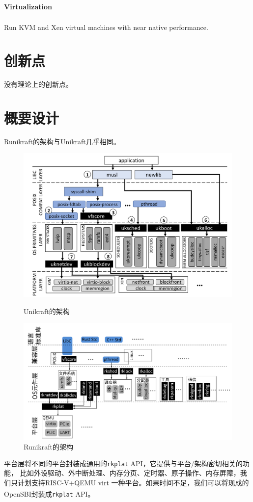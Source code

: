 \documentclass[UTF8,fontset=none,linespread=1.15]{ctexart}
\let\nosupcite\cite
\renewcommand*{\cite}[1]{\textsuperscript{\nosupcite{#1}}}
\begin{document}
\paragraph{Virtualization}Run KVM and Xen virtual machines with near native performance.\cite{1}

\section{创新点}
没有理论上的创新点。
\section{概要设计}
Runikraft的架构与Unikraft几乎相同。
\begin{figure}[!hbt]
\centering
\begin{minipage}{0.49\linewidth}
\centering
\includegraphics[width=\linewidth]{assets/Unikraft-architecture.png}
\caption{Unikraft的架构}\label{fig:unikraft-arch}
\end{minipage}
\begin{minipage}{0.49\linewidth}
\centering
\includegraphics[width=\linewidth]{assets/Runikraft-architecture.pdf}
\caption{Runikraft的架构}\label{fig:runikraft-arch}
\end{minipage}
\end{figure}
平台层将不同的平台封装成通用的\texttt{rkplat} API，它提供与平台/架构密切相关的功能，
比如外设驱动、外中断处理、内存分页、定时器、原子操作、内存屏障，我们只计划支持RISC-V+QEMU virt
一种平台。如果时间不足，我们可以将现成的OpenSBI\cite{5}\cite{6}封装成\texttt{rkplat} API。
\end{document}
